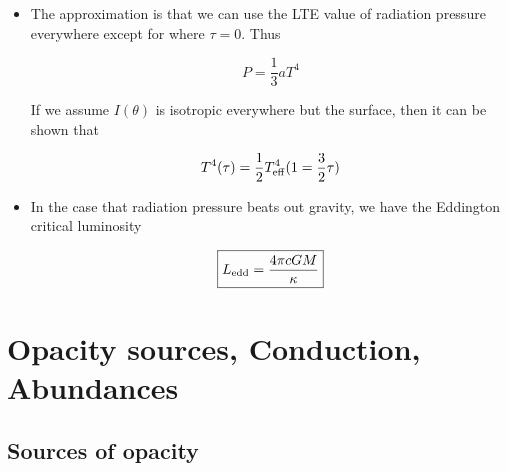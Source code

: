 \documentclass{article}
\begin{document}
\begin{itemize}
    \item The approximation is that we can use the LTE value of radiation pressure everywhere except for where $\tau = 0$. Thus

    \begin{equation}
        P = \frac{1}{3}aT^4
    \end{equation}

    If we assume $I(\theta)$ is isotropic everywhere but the surface, then it can be shown that

    \begin{equation}
        T^4(\tau) = \frac{1}{2}T_{\rm eff} ^4(1 = \frac{3}{2}\tau)
    \end{equation}

    \item In the case that radiation pressure beats out gravity, we have the Eddington critical luminosity

    \begin{equation}
        \boxed{L_{\rm edd} = \frac{4\pi cGM}{\kappa}}
    \end{equation}
    
\end{itemize}

\section{Opacity sources, Conduction, Abundances}

\subsection{Sources of opacity}
\end{document}
